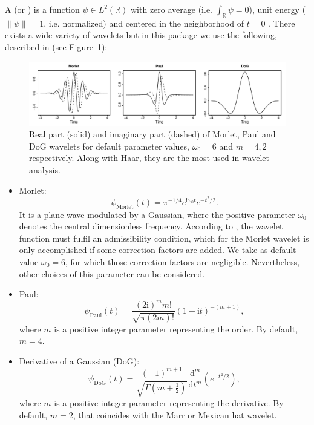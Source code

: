 A  (or ) is a function $\psi \in L^2\left( \mathbb{R}\right) $ with zero average (i.e.  $\int _{\mathbb{R}} \psi =0$), unit energy ($\| \psi \| =1$, i.e. normalized) and centered in the neighborhood of $t=0$ \citep{mal98}. There exists a wide variety of wavelets but in this package we use the following, described in \citet{tor98} (see Figure~\ref{fig:wav}):

\begin{figure}[tbp]
\begin{center}
  \includegraphics[width=1\textwidth]{Figure1}
\end{center}
\caption{Real part (solid) and imaginary part (dashed) of Morlet, Paul and DoG wavelets for default parameter values, $\omega _0=6$ and $m=4,2$ respectively. Along with Haar, they are the most used in wavelet analysis.}
\label{fig:wav}
\end{figure}

\begin{itemize}
\item Morlet:
\[
\psi _{\textrm{Morlet}}(t)=\pi^{-1/4}e^{\mathrm{i}\omega_0 t}e^{-t^2/2}.
\]
It is a plane wave modulated by a Gaussian, where the positive parameter $\omega _0$ denotes the central dimensionless frequency. According to \citet{far92}, the wavelet function must fulfil an admissibility condition, which for the Morlet wavelet is only accomplished if some correction factors are added. We take as default value $\omega _0=6$, for which those correction factors are negligible. Nevertheless, other choices of this parameter can be considered.%
\item Paul:
\[
\psi _{\textrm{Paul}}(t)=\frac{\left(2\mathrm{i}\right)^m m!}{\sqrt{\pi\left(2m\right)!}}\left( 1-\mathrm{i}t\right)^{-\left( m+1\right)},
\]
where $m$ is a positive integer parameter representing the order. By default, $m=4$.
\item Derivative of a Gaussian (DoG):
\[
\psi _{\textrm{DoG}}(t)=\frac{\left(-1\right)^{m+1}}{\sqrt{\Gamma\left( m+\frac{1}{2}\right)}}\frac{\mathrm{d}^m}{\mathrm{d}t^m}\left( e^{-t^2/2}\right) ,
\]
where $m$ is a positive integer parameter representing the derivative. By default, $m=2$, that coincides with the Marr or Mexican hat wavelet.
\end{itemize}


